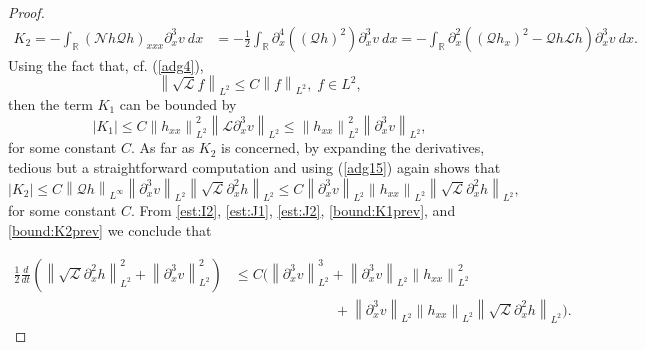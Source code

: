 \documentclass[final,11pt,a4paper,reqno]{amsart}
\newcommand{\norm}[1]{\left\| #1 \right\|}
\newcommand{\RR}{\mathbb R}
\newcommand{\pa}{\partial}
\theoremstyle{definition}
\begin{document}
\begin{proof}
\begin{align*}
K_{2}=-\int_{\RR} (\mathscr{N}h\mathscr{Q}h)_{xxx} \pa_{x}^{3}v \  dx &=- \frac{1}{2} \int_{\RR} \pa_{x}^{4}\left( (\mathscr{Q}h)^{2}
\right) \pa_{x}^{3}v \  dx =-\int_{\RR}\pa_{x}^{2}\left( (\mathscr{Q}h_{x})^{2}-\mathscr{Q}h\mathscr{L}h\right) \pa_{x}^{3}v \  dx.
\end{align*}
Using the fact that, cf. (\ref{adg4}), 
\begin{equation}\label{adg15}
\norm{\sqrt{\mathscr{L}}f}_{L^2}\leq C \norm{f}_{L^{2}},\; f\in L^{2},
\end{equation}
then the term $K_{1}$ can be bounded by
\begin{equation}\label{bound:K1prev}
|K_{1}|\leq C \norm{h_{xx}}_{L^{2}}^{2}\norm{\mathscr{L}\pa_{x}^{3}v}_{L^{2}} \leq \norm{h_{xx}}_{L^{2}}^{2}\norm{\pa_{x}^{3}v}_{L^{2}},
\end{equation}
for some constant $C$. As far as $K_{2}$ is concerned, by expanding the derivatives, tedious but a straightforward computation and using (\ref{adg15}) again shows that
\begin{equation}\label{bound:K2prev}
|K_2| \leq C \norm{\mathscr{Q}h}_{L^{\infty}} \norm{\pa_{x}^{3}v}_{L^{2}}\norm{\sqrt{\mathscr{L}}\pa_{x}^2 h}_{L^{2}} \leq C    \norm{\pa_{x}^{3}v}_{L^{2}}\norm{h_{xx}}_{L^{2}} \norm{\sqrt{\mathscr{L}}\pa_{x}^2 h}_{L^{2}},
\end{equation}
for some constant $C$. From \eqref{est:I2}, \eqref{est:J1}, \eqref{est:J2}, \eqref{bound:K1prev}, and \eqref{bound:K2prev} we conclude that

\begin{align}
\frac{1}{2}\frac{d}{dt}\left( \norm{\sqrt{\mathscr{L}}\pa_{x}^{2}h}_{L^{2}}^{2}+ \norm{\pa_{x}^{3}v}_{L^{2}}^{2} \right) &\leq  C \bigg( \norm{\pa_{x}^{3}v}^{3}_{L^{2}}+\norm{\pa_{x}^{3}v}_{L^{2}} \norm{h_{xx}}^{2}_{L^{2}} \nonumber \\
&\hspace{3cm} +\norm{\pa_{x}^{3}v}_{L^{2}}\norm{h_{xx}}_{L^{2}} \norm{\sqrt{\mathscr{L}}\pa_{x}^2 h}_{L^{2}} \bigg).\label{adg16}
\end{align}


\end{proof}
\end{document}
